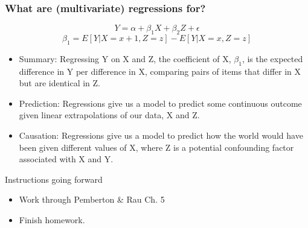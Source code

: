 \documentclass[aspectratio=169]{beamer}
\numberwithin{equation}{section}
\begin{document}
\begin{frame}
\frametitle{What are (multivariate) regressions for?}
$$Y= \alpha+\beta_1X+ \beta_2 Z+\epsilon$$
$$\beta_1 = E[Y|X = x+1, Z =z] - E[Y|X = x, Z =z] $$
\begin{itemize}
\item Summary: Regressing Y on X and Z, the coefficient of X, $\beta_1$, is the expected difference in Y per difference in X, comparing pairs of items that differ in X but are identical in Z.\pause
\item Prediction: Regressions give us a model to predict some continuous outcome given linear extrapolations of our data, X and Z.\pause
\item Causation: Regressions give us a model to predict how the world would have been given different values of X, where Z is a potential confounding factor associated with X and Y.
\end{itemize}

\end{frame}


\begin{frame}{Instructions going forward}
\begin{itemize}
\item Work through Pemberton \& Rau Ch. 5
\item Finish homework.
\end{itemize}
\end{frame}
\end{document}
